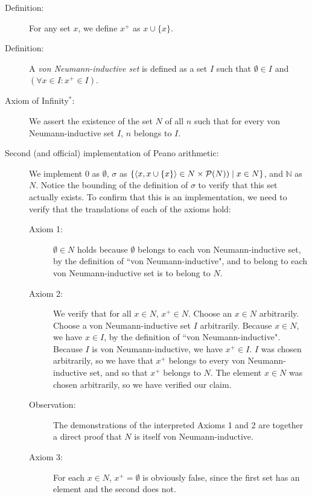 \documentclass[12pt]{book}
\begin{document}
\begin{description}

\item[Definition:]  For any set $x$, we define $x^+$ as $x \cup \{x\}$.

\item[Definition:]  A {\em von Neumann-inductive set\/} is defined as a set $I$ such that $\emptyset \in I$  and $(\forall x \in I:x^+ \in I)$.

\item[Axiom of Infinity$^*$:]  We assert the existence of the set $N$  of all $n$ such that for every von Neumann-inductive set $I$, $n$ belongs to $I$.

\item[Second (and official)  implementation of Peano arithmetic:]  We implement 0 as $\emptyset$, $\sigma$ as $\{\left<x,x \cup \{x\}\right> \in {N} \times {\cal P}(N))\mid x \in {N}\}$, and $\mathbb N$ as $N$.  Notice the bounding of the definition of $\sigma$ to verify that this set actually exists.  To confirm that this is an implementation, we need to verify that the translations of each of the axioms hold:

\begin{description}

\item[Axiom 1:]  $\emptyset \in N$ holds because $\emptyset$ belongs to each von Neumann-inductive set, by the definition of ``von Neumann-inductive", and to belong to each von Neumann-inductive set is to belong to $N$.

\item[Axiom 2:]  We verify that for all $x \in N$, $x^+ \in N$.  Choose an $x \in N$ arbitrarily.  Choose a von Neumann-inductive set $I$ arbitrarily.  Because $x \in N$, we have $x \in I$, by the definition of ``von Neumann-inductive".  Because $I$ is von Neumann-inductive, we have $x^+ \in I$.  $I$ was chosen arbitrarily, so we have that $x^+$ belongs to every von Neumann-inductive set, and so that $x^+$ belongs to $N$.  The element $x \in N$ was chosen arbitrarily, so we have verified our claim.

\item[Observation:]  The demonstrations of the interpreted Axioms 1 and 2 are together a direct proof that $N$ is itself von Neumann-inductive.

\item[Axiom 3:]  For each $x \in N$, $x^+ = \emptyset$ is obviously false, since the first set has an element and the second does not.


\end{description}
\end{description}
\end{document}
